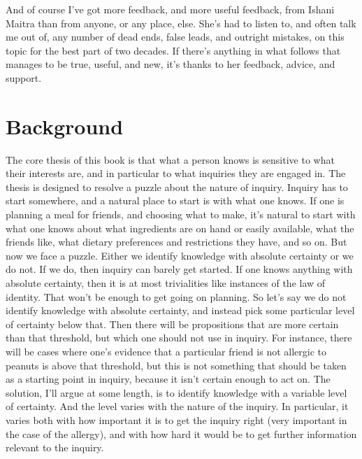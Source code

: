 \documentclass[
  11pt,
]{book}
\renewcommand{\headrulewidth}{0pt}
\renewcommand{\footrulewidth}{0pt}
\renewcommand{\headrulewidth}{0pt}
\begin{document}
And of course I've got more feedback, and more useful feedback, from Ishani Maitra than from anyone, or any place, else. She's had to listen to, and often talk me out of, any number of dead ends, false leads, and outright mistakes, on this topic for the best part of two decades. If there's anything in what follows that manages to be true, useful, and new, it's thanks to her feedback, advice, and support.

\hypertarget{background}{%
\chapter{Background}\label{background}}

\fancyhf{}
\fancyhead[C]{\textit \leftmark}
\fancyhead[R]{\thepage}
\fancyfoot{}
\renewcommand{\headrulewidth}{0pt}
\renewcommand{\footrulewidth}{0pt}
\addtolength{\headheight}{1.6pt}
\fancypagestyle{plain}{
  \fancyhead{}
  \renewcommand{\headrulewidth}{0pt}
}

The core thesis of this book is that what a person knows is sensitive to what their interests are, and in particular to what inquiries they are engaged in. The thesis is designed to resolve a puzzle about the nature of inquiry. Inquiry has to start somewhere, and a natural place to start is with what one knows. If one is planning a meal for friends, and choosing what to make, it's natural to start with what one knows about what ingredients are on hand or easily available, what the friends like, what dietary preferences and restrictions they have, and so on. But now we face a puzzle. Either we identify knowledge with absolute certainty or we do not. If we do, then inquiry can barely get started. If one knows anything with absolute certainty, then it is at most trivialities like instances of the law of identity. That won't be enough to get going on planning. So let's say we do not identify knowledge with absolute certainty, and instead pick some particular level of certainty below that. Then there will be propositions that are more certain than that threshold, but which one should not use in inquiry. For instance, there will be cases where one's evidence that a particular friend is not allergic to peanuts is above that threshold, but this is not something that should be taken as a starting point in inquiry, because it isn't certain enough to act on. The solution, I'll argue at some length, is to identify knowledge with a variable level of certainty. And the level varies with the nature of the inquiry. In particular, it varies both with how important it is to get the inquiry right (very important in the case of the allergy), and with how hard it would be to get further information relevant to the inquiry.
\end{document}
